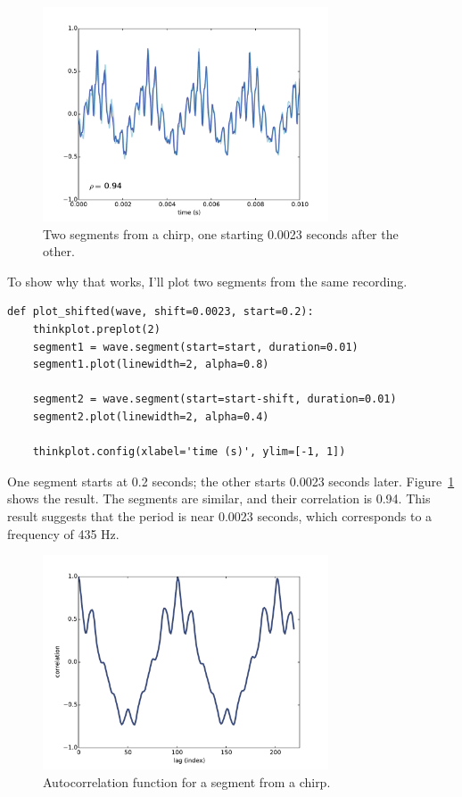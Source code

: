 \documentclass[12pt]{book}
\begin{document}
\begin{figure}
\centerline{\includegraphics[height=2.5in]{figs/autocorr7.pdf}}
\caption{Two segments from a chirp, one starting 0.0023 seconds
after the other.}
\label{fig.autocorr7}
\end{figure}

To show why that works, I'll plot two segments from the same
recording.

\begin{verbatim}
def plot_shifted(wave, shift=0.0023, start=0.2):
    thinkplot.preplot(2)
    segment1 = wave.segment(start=start, duration=0.01)
    segment1.plot(linewidth=2, alpha=0.8)

    segment2 = wave.segment(start=start-shift, duration=0.01)
    segment2.plot(linewidth=2, alpha=0.4)

    thinkplot.config(xlabel='time (s)', ylim=[-1, 1])
\end{verbatim} 

One segment starts at 0.2 seconds; the other starts 0.0023 seconds
later.  Figure~\ref{fig.autocorr7} shows the result.  The segments
are similar, and their correlation is 0.94.  This result suggests
that the period is near 0.0023 seconds, which corresponds to a frequency
of 435 Hz.

\begin{figure}
\centerline{\includegraphics[height=2.5in]{figs/autocorr8.pdf}}
\caption{Autocorrelation function for a segment from a chirp.}
\label{fig.autocorr8}
\end{figure}
\end{document}
